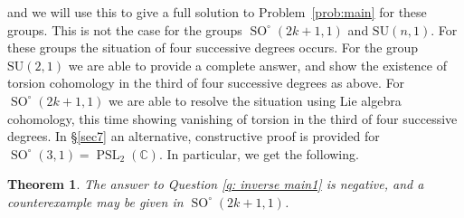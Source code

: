 \documentclass[12pt,reqno]{amsart}
\newcommand{\C}{\mathbb{C}}
\newtheorem{theorem}{Theorem}[section]
\theoremstyle{definition}
\newcommand{\PSL}{\operatorname{PSL}}
\newcommand{\SO}{\operatorname{SO}}
\begin{document}
and we will use this to give a full solution to Problem~\ref{prob:main} for these groups.
This is not the case for the groups $\SO^\circ(2k+1,1)$ and $\mathrm{SU}(n,1)$. For these groups the situation of four successive degrees occurs. For the group $\mathrm{SU}(2,1)$ we are able to provide a complete answer, and show the existence of torsion cohomology in the third of four successive degrees as above. For $\SO^\circ(2k+1,1)$ we are able to resolve the situation using Lie algebra cohomology, this time showing vanishing of torsion in the third of four successive degrees. In \S \ref{sec7} an alternative, constructive proof is provided for $\SO^\circ(3,1)=\PSL_2(\C)$. In particular, we get the following.
\begin{theorem}\label{thm:neg answer sl2C}
      The answer to Question \ref{q: inverse main1} is negative, and a counterexample may be given in $\SO^{\circ}(2k+1,1)$.
\end{theorem}
\end{document}
